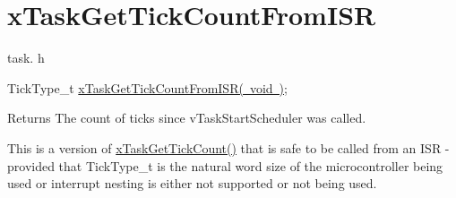 \hypertarget{group__x_task_get_tick_count_from_i_s_r}{}\section{x\+Task\+Get\+Tick\+Count\+From\+I\+SR}
\label{group__x_task_get_tick_count_from_i_s_r}
task. h 
\begin{DoxyPre}TickType\_t \mbox{\hyperlink{task_8h_a092be3fd5752625303c307620be523ff}{xTaskGetTickCountFromISR( void )}};\end{DoxyPre}


\begin{DoxyReturn}{Returns}
The count of ticks since v\+Task\+Start\+Scheduler was called.
\end{DoxyReturn}
This is a version of \mbox{\hyperlink{task_8h_a753ecfe23e7386066ecccad5d16422f7}{x\+Task\+Get\+Tick\+Count()}} that is safe to be called from an I\+SR -\/ provided that Tick\+Type\+\_\+t is the natural word size of the microcontroller being used or interrupt nesting is either not supported or not being used. 